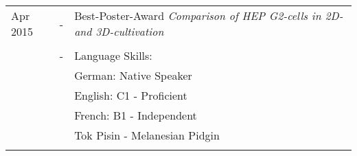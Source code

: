 \begin{enumerate}[label=\Alph*.]
	\begin{tabulary}{\textwidth}{@{}p{3.8cm}CL}
		Apr 2015 & - & Best-Poster-Award \newline \textit{Comparison of HEP G2-cells in 2D- and 3D-cultivation}\\
		\\[-0.5em]
		& - & Language Skills:           \\
		& & German:  Native Speaker      \\
		& & English: C1 - Proficient     \\
		& & French:  B1 - Independent    \\
		& & Tok Pisin - Melanesian Pidgin\\
		\\[-0.5em]
		
	\end{tabulary}
	
\end{enumerate}
